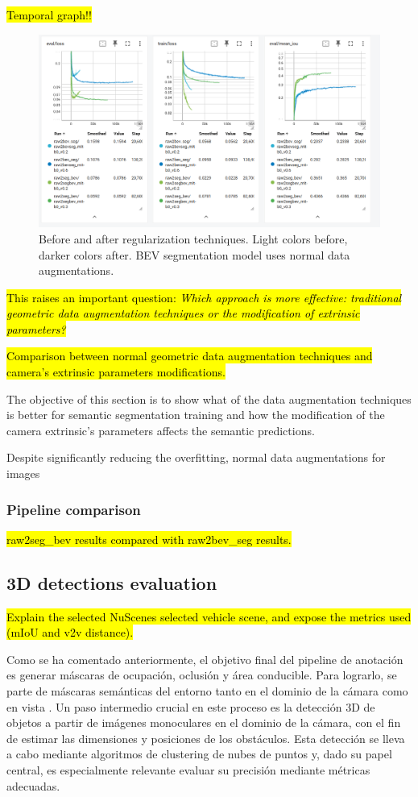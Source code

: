 \hl{Temporal graph!!}
\begin{figure}[h!]
    \centering
    \includegraphics[width=0.7\linewidth]{./images/experiments/before_an_after_data_aug.png}
    \caption{Before and after regularization techniques. Light colors before, darker colors after. BEV segmentation model uses normal data augmentations.}
    \label{fig:before_after_data_aug}
\end{figure}


\hl{This raises an important question: \textit{Which approach is more effective: traditional geometric data augmentation techniques or the modification of extrinsic parameters?}}

\hl{Comparison between normal geometric data augmentation techniques and camera's extrinsic parameters modifications.}

The objective of this section is to show what of the data augmentation techniques is better for  semantic segmentation training and how the modification of the camera extrinsic's parameters affects the semantic predictions.

Despite significantly reducing the overfitting, normal data augmentations for  images


\subsubsection{Pipeline comparison}
\hl{raw2seg\_bev results compared with raw2bev\_seg results.}



\subsection{3D detections evaluation}
\hl{Explain the selected NuScenes selected vehicle scene, and expose the metrics used (mIoU and v2v distance).}



Como se ha comentado anteriormente, el objetivo final del pipeline de anotación es generar máscaras de ocupación, oclusión y área conducible. Para lograrlo, se parte de máscaras semánticas del entorno tanto en el dominio de la cámara como en vista . Un paso intermedio crucial en este proceso es la detección 3D de objetos a partir de imágenes monoculares en el dominio de la cámara, con el fin de estimar las dimensiones y posiciones de los obstáculos. Esta detección se lleva a cabo mediante algoritmos de clustering de nubes de puntos y, dado su papel central, es especialmente relevante evaluar su precisión mediante métricas adecuadas.

